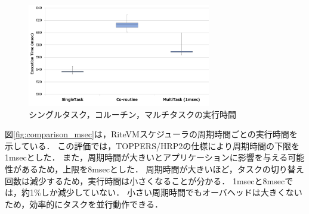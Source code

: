 \documentclass[submit,techrep]{ipsj}
\begin{document}


\begin{figure}[t]
    \centering
    \includegraphics[width=8cm,clip]{../EMSOFT2016/figure/comparison_s_c_m.pdf}
    \vspace{-2mm}
    \caption{シングルタスク，コルーチン，マルチタスクの実行時間}
\vspace{-3mm}
    \label{fig:comparison_s_c_m}
\end{figure}

図\ref{fig:comparison_msec}は，RiteVMスケジューラの周期時間ごとの実行時間を示している．
この評価では，TOPPERS/HRP2の仕様により周期時間の下限を1msecとした．
また，周期時間が大きいとアプリケーションに影響を与える可能性があるため，上限を8msecとした．
周期時間が大きいほど，タスクの切り替え回数は減少するため，実行時間は小さくなることが分かる．
1msecと8msecでは，約1\%しか減少していない．
小さい周期時間でもオーバヘッドは大きくないため，効率的にタスクを並行動作できる．
\end{document}
